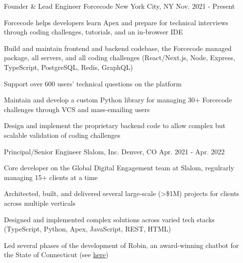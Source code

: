 \begin{cventries}
  \cventry
    {Founder \& Lead Engineer} %
    {Forcecode} %
    {New York City, NY} %
    {Nov. 2021 - Present} %
    {
      \begin{cvitems} %
        \item {Forcecode helps developers learn Apex and prepare for technical interviews through coding challenges, tutorials, and an in-browser IDE}
        \item {Build and maintain frontend and backend codebase, the Forcecode managed package, all servers, and all coding challenges (React/Next.js, Node, Express, TypeScript, PostgreSQL, Redis, GraphQL)}
        \item {Support over 600 users' technical questions on the platform}
        \item {Maintain and develop a custom Python library for managing 30+ Forcecode challenges through VCS and mass-emailing users}
        \item {Design and implement the proprietary backend code to allow complex but scalable validation of coding challenges}
      \end{cvitems}
    }


  \cventry
    {Principal/Senior Engineer} %
    {Slalom, Inc.} %
    {Denver, CO} %
    {Apr. 2021 - Apr. 2022} %
    {
      \begin{cvitems} %
        \item {Core developer on the Global Digital Engagement team at Slalom, regulrarly managing 15+ clients at a time}
        \item {Architected, built, and delivered several large-scale (>\$1M) projects for clients across multiple verticals}
        \item {Designed and implemented complex solutions across varied tech stacks (TypeScript, Python, Apex, JavaScript, REST, HTML)}
        \item {Led several phases of the development of Robin, an award-winning chatbot for the State of Connecticut (see \href{https://portal.ct.gov/das/dasblog/das-team-wins-government-experience-award}{\color{awesome-skyblue}here})}
      \end{cvitems}
    }


\end{cventries}
